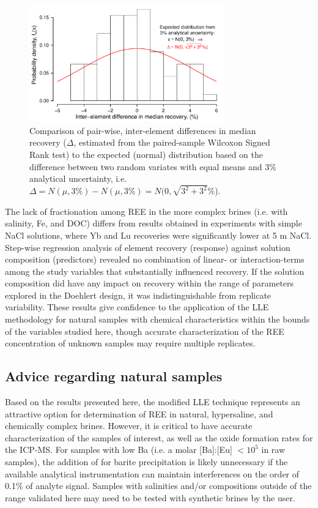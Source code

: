 \begin{figure}[htbp]
\begin{center}
\includegraphics[width=0.75\textwidth]{Ch4_figures/element-diff-hist.pdf}
\caption{Comparison of pair-wise, inter-element differences in median recovery ($\Delta$, estimated from the paired-sample Wilcoxon Signed Rank test) to the expected (normal) distribution based on the difference between two random variates with equal means and 3\% analytical uncertainty, i.e.
$\Delta = N(\mu, 3\%) - N(\mu, 3\%) = N(0,\sqrt{3^2 + 3^2 }\%$).}
\label{fig:element-diff-hist}
\end{center}
\end{figure}


The lack of fractionation among REE in the more complex brines (i.e. with salinity, Fe, and DOC) differs from results obtained in experiments with simple NaCl solutions, where Yb and Lu recoveries were significantly lower at 5 m NaCl.
Step-wise regression analysis of element recovery (response) against solution composition (predictors) revealed no combination of linear- or interaction-terms among the study variables that substantially influenced recovery.
If the solution composition did have any impact on recovery within the range of parameters explored in the Doehlert design, it was indistinguishable from replicate variability.
These results give confidence to the application of the LLE methodology for natural samples with chemical characteristics within the bounds of the variables studied here, though accurate characterization of the REE concentration of unknown samples may require multiple replicates.

\subsection{Advice regarding natural samples}

Based on the results presented here, the modified LLE technique represents an attractive option for determination of REE in natural, hypersaline, and chemically complex brines.
However, it is critical to have accurate characterization of the samples of interest, as well as the oxide formation rates for the ICP-MS.
For samples with low Ba (i.e. a molar [Ba]:[Eu] $<10^5$ in raw samples), the addition of  for barite precipitation is likely unnecessary if the available analytical instrumentation can maintain  interferences on the order of 0.1\% of analyte signal.
Samples with salinities and/or compositions outside of the range validated here may need to be tested with synthetic brines by the user.

